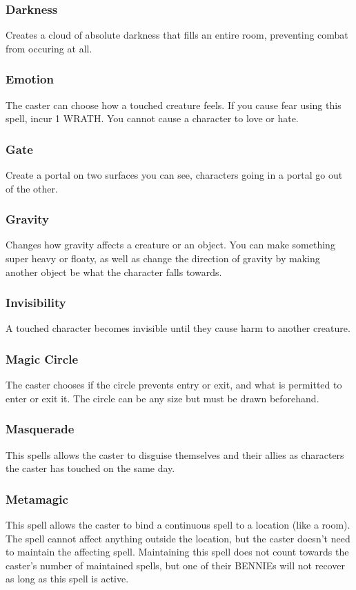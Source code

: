 \begin{multicols}{3}
\subsubsection*{Darkness}
Creates a cloud of absolute darkness that fills an entire room, preventing combat from occuring at all.
\subsubsection*{Emotion}
The caster can choose how a touched creature feels. If you cause fear using this spell, incur 1 WRATH. You cannot cause a character to love or hate.
\subsubsection*{Gate}
Create a portal on two surfaces you can see, characters going in a portal go out of the other.
\subsubsection*{Gravity}
Changes how gravity affects a creature or an object. You can make something super heavy or floaty, as well as change the direction of gravity by making another object be what the character falls towards.
\subsubsection*{Invisibility}
A touched character becomes invisible until they cause harm to another creature.
\subsubsection*{Magic Circle}
The caster chooses if the circle prevents entry or exit, and what is permitted to enter or exit it. The circle can be any size but must be drawn beforehand.
\subsubsection*{Masquerade}
This spells allows the caster to disguise themselves and their allies as characters the caster has touched on the same day.
\subsubsection*{Metamagic}
This spell allows the caster to bind a continuous spell to a location (like a room). The spell cannot affect anything outside the location, but the caster doesn't need to maintain the affecting spell. Maintaining this spell does not count towards the caster's number of maintained spells, but one of their BENNIEs will not recover as long as this spell is active.

\end{multicols}
